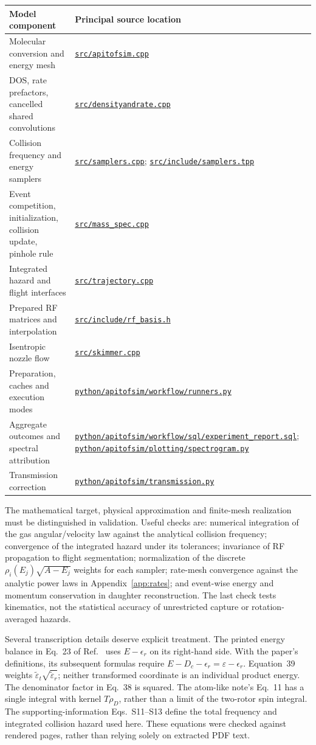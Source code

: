 \documentclass[10pt,a4paper]{article}
\newcommand{\code}[1]{\href{https://github.com/VilmaLab/apitofsim/blob/main/#1}{\nolinkurl{#1}}}
\begin{document}
\begin{tabularx}{\textwidth}{@{}>{\raggedright\arraybackslash}p{}>{\raggedright\arraybackslash}X@{}}
\toprule Model component & Principal source location\\\midrule
Molecular conversion and energy mesh & \code{src/apitofsim.cpp}\\
DOS, rate prefactors, cancelled shared convolutions & \code{src/densityandrate.cpp}\\
Collision frequency and energy samplers & \code{src/samplers.cpp}; \code{src/include/samplers.tpp}\\
Event competition, initialization, collision update, pinhole rule & \code{src/mass_spec.cpp}\\
Integrated hazard and flight interfaces & \code{src/trajectory.cpp}\\
Prepared RF matrices and interpolation & \code{src/include/rf_basis.h}\\
Isentropic nozzle flow & \code{src/skimmer.cpp}\\
Preparation, caches and execution modes & \code{python/apitofsim/workflow/runners.py}\\
Aggregate outcomes and spectral attribution & \code{python/apitofsim/workflow/sql/experiment_report.sql}; \code{python/apitofsim/plotting/spectrogram.py}\\
Transmission correction & \code{python/apitofsim/transmission.py}\\
\bottomrule
\end{tabularx}

The mathematical target, physical approximation and finite-mesh realization
must be distinguished in validation. Useful checks are: numerical integration
of the gas angular/velocity law against the analytical collision frequency;
convergence of the integrated hazard under its tolerances; invariance of RF
propagation to flight segmentation; normalization of the discrete
$\rho_i(E_j)\sqrt{A-E_j}$ weights for each sampler; rate-mesh convergence
against the analytic power laws in Appendix~\ref{app:rates}; and event-wise
energy and momentum conservation in daughter reconstruction. The last check
tests kinematics, not the statistical accuracy of unrestricted capture or
rotation-averaged hazards.

Several transcription details deserve explicit treatment. The printed energy
balance in Eq.~23 of Ref.~\cite{zapadinsky} uses $E-\epsilon_r$ on its
right-hand side. With the paper's definitions, its subsequent formulas require
$E-D_c-\epsilon_r=\varepsilon-\epsilon_r$. Equation~39 weights
$\widetilde\varepsilon_t\sqrt{\widetilde\varepsilon_r}$; neither transformed
coordinate is an individual product energy. The denominator factor in Eq.~38
is squared. The atom-like note's Eq.~11 has a single integral with kernel
$T\rho_D$, rather than a limit of the two-rotor spin integral. The
supporting-information Eqs.~S11--S13 define the total frequency and integrated
collision hazard used here. These equations were checked against rendered
pages, rather than relying solely on extracted PDF text.
\end{document}
